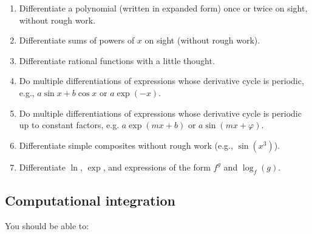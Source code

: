 \documentclass[10pt]{amsart}
\begin{document}
\begin{enumerate}
\item Differentiate a polynomial (written in expanded form) once or
  twice on sight, without rough work.
\item Differentiate sums of powers of $x$ on sight (without rough
  work).
\item Differentiate rational functions with a little thought.
\item Do multiple differentiations of expressions whose derivative
  cycle is periodic, e.g., $a \sin x + b \cos x$ or $a \exp(-x)$.
\item Do multiple differentiations of expressions whose derivative
  cycle is periodic up to constant factors, e.g. $a \exp(mx + b)$ or $a
  \sin(mx + \varphi)$.
\item Differentiate simple composites without rough work (e.g.,
  $\sin(x^3)$).
\item Differentiate $\ln$, $\exp$, and expressions of the form $f^g$
  and $\log_f(g)$.
\end{enumerate}

\subsection{Computational integration}

You should be able to:
\end{document}
